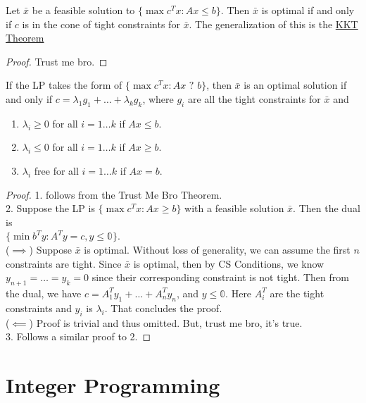\documentclass[a4paper]{report}
\begin{document}
	\begin{theorem}
		Let $\bar x$ be a feasible solution to $\{\max c^{T} x : Ax \leq b\}$. Then
		$\bar x$ is optimal if and only if $c$ is in the cone of tight constraints
		for $\bar x$. The generalization of this is the \hyperref[kkt]{KKT Theorem}
	\end{theorem}
	\begin{proof}
		Trust me bro.
	\end{proof}
	\begin{corollary}
		If the LP takes the form of $\{\max c^{T} x : Ax \text{ ? }b\}$, then
		$\bar x$ is an optimal solution if and only if
		$c = \lambda_{1} g_{1} + \dots + \lambda_{k} g_{k}$, where $g_{i}$ are all the
		tight constraints for $\bar x$ and
		\begin{enumerate}
			\item $\lambda_{i} \geq 0$ for all $i = 1 \dots k$ if $Ax \leq b$.

			\item $\lambda_{i} \leq 0$ for all $i = 1 \dots k$ if $Ax \geq b$.

			\item $\lambda_{i}$ free for all $i = 1 \dots k$ if $Ax = b$.
		\end{enumerate}
	\end{corollary}
	\begin{proof}
		1. follows from the Trust Me Bro Theorem. \\[0.3in] 2. Suppose the LP is
		$\{\max c^{T} x : Ax \geq b\}$ with a feasible solution $\bar x$. Then the dual
		is \\ $\{\min b^{T} y : A^{T} y = c, y \leq \mathbb{0}\}$.\\[0.15in] ($\implies$)
		Suppose $\bar x$ is optimal. Without loss of generality, we can assume the first
		$n$ constraints are tight. Since $\bar x$ is optimal, then by CS Conditions,
		we know $y_{n+1}= \dots = y_{k} = 0$ since their corresponding constraint is
		not tight. Then from the dual, we have
		$c = A^{T}_{1} y_{1} + \dots + A^{T}_{n} y_{n}$, and $y \leq \mathbb{0}$.
		Here $A^{T}_{i}$ are the tight constraints and $y_{i}$ is $\lambda_{i}$. That
		concludes the proof.\\[0.15in] ($\impliedby$) Proof is trivial and thus omitted.
		But, trust me bro, it's true. \\[0.3in] 3. Follows a similar proof to 2.
	\end{proof}

	\chapter{Integer Programming}
\end{document}
